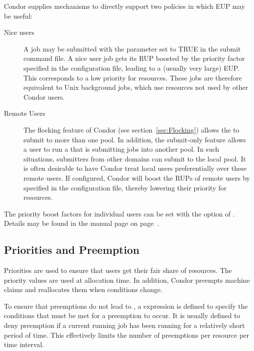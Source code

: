 Condor supplies mechanisms to directly support two policies in which EUP may
be useful:
\begin{description}
	\item[Nice users]  A job may be submitted with the parameter 
	 set to TRUE in the submit command file.
	A nice user job gets its RUP boosted by the 
	 priority factor specified in the 
	configuration file, leading to a (usually very large) EUP.
	This corresponds to a low priority for resources.
	These jobs are therefore equivalent to Unix background jobs,
	which use resources not used by other Condor users.

	\item[Remote Users] The flocking feature of Condor (see
	section~\ref{sec:Flocking}) allows the  to
	submit to more than one pool.
	In addition, the submit-only feature allows a user to run a
	 that is submitting jobs into another pool.
	In such situations, submitters from other domains
	can submit to the local pool.
	It is often desirable to have Condor treat local users
	preferentially over these remote users.
	If configured, Condor will boost the RUPs of remote users by
	specified in the configuration file,
	thereby lowering their priority for resources.
\end{description}

The priority boost factors for individual users can be set with the 
 option of .
Details may be found in the  manual page 
on page~\pageref{man-condor-userprio}.

\subsection{Priorities and Preemption}
Priorities are used to ensure that users get their fair share of resources.  
The priority values are used at allocation time.
In addition, Condor preempts machine claims and reallocates them when
conditions change.

To ensure that preemptions do not lead to ,
a  expression is defined to specify the
conditions that must be met for a preemption to occur.
It is usually defined to deny preemption if a current running job
has been running for a relatively short period of time.
This effectively limits the number of preemptions per resource per time
interval.

